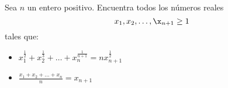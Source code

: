 Sea $n$ un entero positivo. Encuentra todos los números reales 
\[x_1,x_2,\dots,\x_{n+1}\geq1\]
tales que:
 \begin{itemize} 
 \item $x_1^{\frac{1}{2}}+x_2^{\frac{1}{3}}+\dots+x_n^{\frac{1}{n+1}}=nx_{n+1}^\frac{1}{2}$
 \item $\frac{x_1+x_2+\dots+x_n}{n}=x_{n+1}$
 \end{itemize} 